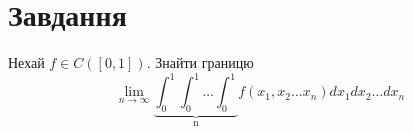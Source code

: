 
\chapter{Завдання \theHchapter}

\begin{tcolorbox}[title=Завдання]
    Нехай $f \in C([0,1])$. Знайти границю
    $$\lim_{n\rightarrow \infty}
    \underbrace{\int_{0}^{1}\int_{0}^{1}\dots\int_{0}^{1}}_{\mbox{n}}
    f(x_1, x_2 \dots x_n) dx_1dx_2\dots dx_n $$
\end{tcolorbox}


